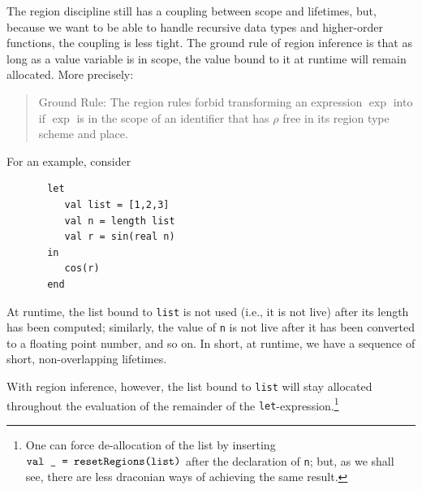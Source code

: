 \documentclass[12pt]{book}
\begin{document}
The region discipline still has a coupling between scope and lifetimes,
but, because we want to be able to handle recursive data types and higher-order
functions, the coupling is less tight. 
The ground rule of region inference
is that as long as a value variable is in scope, the value bound to it
at runtime will remain allocated. More precisely:
\begin{quote}
       Ground Rule: The region rules forbid transforming an expression
       $\exp$ into  if $\exp$ is
       in the scope of an identifier that has $\rho$ free in its region type
       scheme and place.
\end{quote}
For an example, consider
\begin{verbatim}
       let 
          val list = [1,2,3]
          val n = length list
          val r = sin(real n)
       in
          cos(r)
       end
\end{verbatim} 
At runtime, the list bound to {\tt list} is not used (i.e., it is not live) 
after its length has been computed;
similarly, the value of {\tt n} is not live after it has been converted to a floating point
number, and so on. In short, at runtime, we have a sequence of short, non-overlapping
lifetimes. 

With region inference, however, the list bound to {\tt list} will stay allocated
throughout the evaluation of the remainder of the {\tt let}-expression.\footnote{One can
force de-allocation of the list by  inserting 
$\hbox{\tt val \_ = \hbox{\tt resetRegions}(list)}$ after the declaration of {\tt n}; but, as we shall see,
there are less draconian ways of achieving the same result.} 
\end{document}
